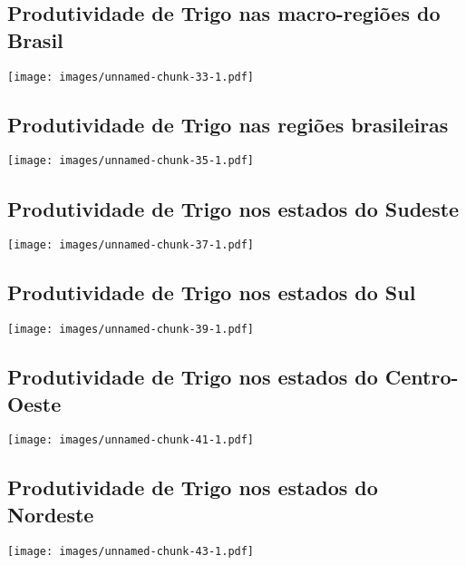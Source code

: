 \documentclass[
]{article}
\begin{document}
\hypertarget{produtividade-de-trigo-nas-macro-regiuxf5es-do-brasil}{%
\subsection{Produtividade de Trigo nas macro-regiões do
Brasil}\label{produtividade-de-trigo-nas-macro-regiuxf5es-do-brasil}}

\texttt{[image: images/unnamed-chunk-33-1.pdf]}

\hypertarget{produtividade-de-trigo-nas-regiuxf5es-brasileiras}{%
\subsection{Produtividade de Trigo nas regiões
brasileiras}\label{produtividade-de-trigo-nas-regiuxf5es-brasileiras}}

\texttt{[image: images/unnamed-chunk-35-1.pdf]}

\hypertarget{produtividade-de-trigo-nos-estados-do-sudeste}{%
\subsection{Produtividade de Trigo nos estados do
Sudeste}\label{produtividade-de-trigo-nos-estados-do-sudeste}}

\texttt{[image: images/unnamed-chunk-37-1.pdf]}

\hypertarget{produtividade-de-trigo-nos-estados-do-sul}{%
\subsection{Produtividade de Trigo nos estados do
Sul}\label{produtividade-de-trigo-nos-estados-do-sul}}

\texttt{[image: images/unnamed-chunk-39-1.pdf]}

\hypertarget{produtividade-de-trigo-nos-estados-do-centro-oeste}{%
\subsection{Produtividade de Trigo nos estados do
Centro-Oeste}\label{produtividade-de-trigo-nos-estados-do-centro-oeste}}

\texttt{[image: images/unnamed-chunk-41-1.pdf]}

\hypertarget{produtividade-de-trigo-nos-estados-do-nordeste}{%
\subsection{Produtividade de Trigo nos estados do
Nordeste}\label{produtividade-de-trigo-nos-estados-do-nordeste}}

\texttt{[image: images/unnamed-chunk-43-1.pdf]}
\end{document}
